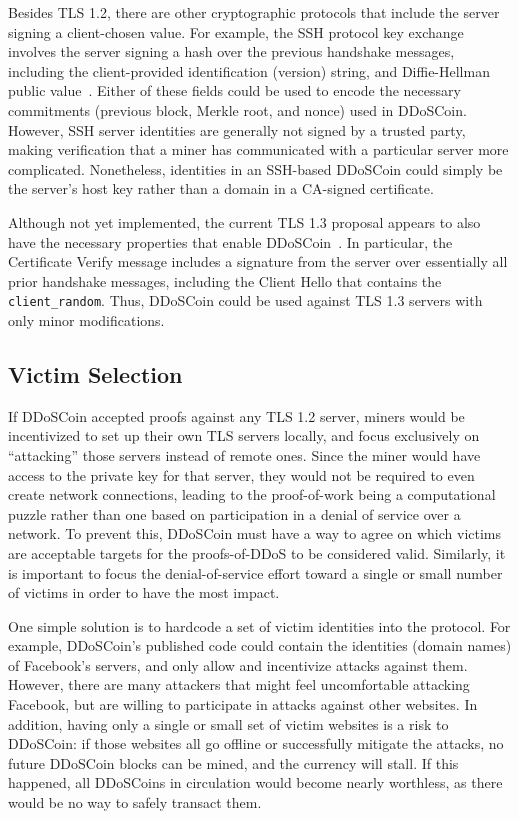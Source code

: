 Besides TLS 1.2, there are other cryptographic protocols that include the server
signing a client-chosen value. For example, the SSH protocol key exchange
involves the server signing a hash over the previous handshake messages,
including the client-provided identification (version) string, and
Diffie-Hellman public value~\cite{rfc4253}. Either of these fields could be used
to encode the necessary commitments (previous block, Merkle root, and nonce)
used in DDoSCoin.  However, SSH server identities are generally not signed by a
trusted party, making verification that a miner has communicated with a
particular server more complicated.  Nonetheless, identities in an SSH-based
DDoSCoin could simply be the server's host key rather than a domain in a
CA-signed certificate.

Although not yet implemented, the current TLS 1.3 proposal appears to also have the
necessary properties that enable DDoSCoin~\cite{tls-draft}. In particular, the
Certificate Verify message includes a signature from the server over essentially
all prior handshake messages, including the Client Hello that contains the
\texttt{client\_random}. Thus, DDoSCoin could be used against TLS 1.3
servers with only minor modifications.

\subsection{Victim Selection}
\label{sec:victim}

If DDoSCoin accepted proofs against any TLS 1.2 server, miners would be
incentivized to set up their own TLS servers locally, and focus exclusively on
``attacking'' those servers instead of remote ones. Since the miner would have
access to the private key for that server, they would not be required to even
create network connections, leading to the proof-of-work being a computational
puzzle rather than one based on participation in a denial of service over a
network.
To prevent this, DDoSCoin must have a way to agree on which victims are
acceptable targets for the proofs-of-DDoS to be considered valid. Similarly, it
is important to focus the denial-of-service effort toward a single or small
number of victims in order to have the most impact.

One simple solution is to hardcode a set of victim identities into the
protocol.  For example, DDoSCoin's published code could contain the identities
(domain names)
of Facebook's servers, and only allow and incentivize attacks
against them. However, there are many attackers that might feel uncomfortable
attacking Facebook, but are willing to participate in attacks against other
websites. In addition, having only a single or small set of victim websites is a
risk to DDoSCoin: if those websites all go offline or successfully mitigate the
attacks, no future DDoSCoin blocks can be mined, and
the currency will stall. If this happened, all DDoSCoins in circulation would
become nearly worthless, as there would be no way to safely transact them.

